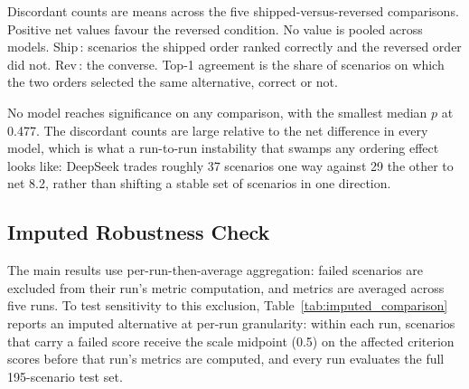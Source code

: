 \documentclass[11pt]{article}
\begin{document}
Discordant counts are means across the five shipped-versus-reversed comparisons. Positive net values favour the reversed condition. No value is pooled across models. Ship\,\checkmark: scenarios the shipped order ranked correctly and the reversed order did not. Rev\,\checkmark: the converse. Top-1 agreement is the share of scenarios on which the two orders selected the same alternative, correct or not.

No model reaches significance on any comparison, with the smallest median $p$ at 0.477. The discordant counts are large relative to the net difference in every model, which is what a run-to-run instability that swamps any ordering effect looks like: DeepSeek trades roughly 37 scenarios one way against 29 the other to net 8.2, rather than shifting a stable set of scenarios in one direction.

\subsection{Imputed Robustness Check}
\label{app:imputed}

The main results use per-run-then-average aggregation: failed scenarios are excluded from their run's metric computation, and metrics are averaged across five runs. To test sensitivity to this exclusion, Table~\ref{tab:imputed_comparison} reports an imputed alternative at per-run granularity: within each run, scenarios that carry a failed score receive the scale midpoint (0.5) on the affected criterion scores before that run's metrics are computed, and every run evaluates the full 195-scenario test set.
\end{document}
